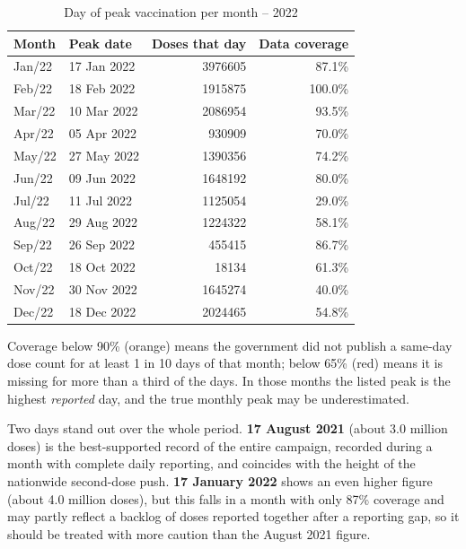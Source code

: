 \documentclass[11pt]{article}
\begin{document}
\begin{table}[H]
\centering
\caption{Day of peak vaccination per month -- 2022}
\label{tab:peaks2022}
\begin{tabular}{l l r r}
\toprule
\textbf{Month} & \textbf{Peak date} & \textbf{Doses that day} & \textbf{Data coverage} \\
\midrule
Jan/22 & 17 Jan 2022 & \num{3976605} & 87.1\% \\
Feb/22 & 18 Feb 2022 & \num{1915875} & 100.0\% \\
Mar/22 & 10 Mar 2022 & \num{2086954} & 93.5\% \\
Apr/22 & 05 Apr 2022 & \num{930909} & \color{orange!80!black}70.0\% \\
May/22 & 27 May 2022 & \num{1390356} & \color{orange!80!black}74.2\% \\
Jun/22 & 09 Jun 2022 & \num{1648192} & \color{orange!80!black}80.0\% \\
Jul/22 & 11 Jul 2022 & \num{1125054} & \color{red!80!black}29.0\% \\
Aug/22 & 29 Aug 2022 & \num{1224322} & \color{red!80!black}58.1\% \\
Sep/22 & 26 Sep 2022 & \num{455415} & \color{orange!80!black}86.7\% \\
Oct/22 & 18 Oct 2022 & \num{18134} & \color{red!80!black}61.3\% \\
Nov/22 & 30 Nov 2022 & \num{1645274} & \color{red!80!black}40.0\% \\
Dec/22 & 18 Dec 2022 & \num{2024465} & \color{red!80!black}54.8\% \\
\bottomrule
\end{tabular}

\vspace{4pt}
\raggedright
{\footnotesize Coverage below 90\% (orange) means the government did not publish a same-day dose
count for at least 1 in 10 days of that month; below 65\% (red) means it is missing for more than a
third of the days. In those months the listed peak is the highest \emph{reported} day, and the true
monthly peak may be underestimated.}
\end{table}

Two days stand out over the whole period. \textbf{17 August 2021} (about 3.0 million doses) is the
best-supported record of the entire campaign, recorded during a month with complete daily reporting,
and coincides with the height of the nationwide second-dose push. \textbf{17 January 2022} shows an
even higher figure (about 4.0 million doses), but this falls in a month with only 87\% coverage and
may partly reflect a backlog of doses reported together after a reporting gap, so it should be
treated with more caution than the August 2021 figure.
\end{document}
